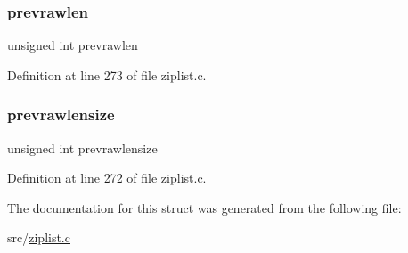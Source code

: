 \subsubsection{\texorpdfstring{prevrawlen}{prevrawlen}}
{\footnotesize\ttfamily unsigned int prevrawlen}



Definition at line 273 of file ziplist.\+c.

\mbox{\label{structzlentry_a162d33e7ac8d8f59f126e3e5c3256c42}} 
\subsubsection{\texorpdfstring{prevrawlensize}{prevrawlensize}}
{\footnotesize\ttfamily unsigned int prevrawlensize}



Definition at line 272 of file ziplist.\+c.



The documentation for this struct was generated from the following file\+:\begin{DoxyCompactItemize}
\item 
src/\hyperlink{ziplist_8c}{ziplist.\+c}\end{DoxyCompactItemize}
